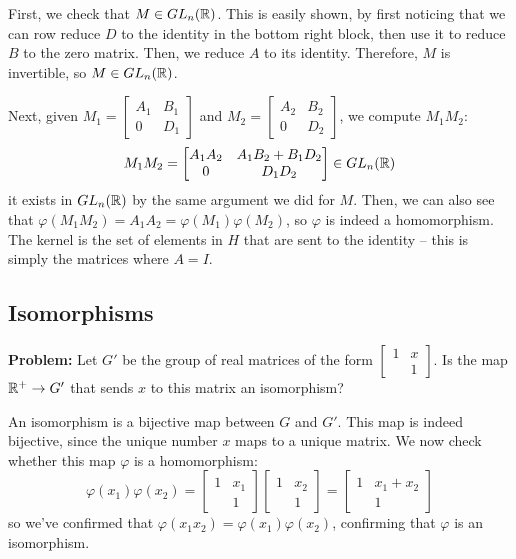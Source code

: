 \documentclass[10pt]{article}
\newenvironment{problem}{\textbf{Problem:}}{}
\begin{document}
\begin{solution}
	First, we check that \( M \in GL_n(\mathbb R) \). This is easily shown, by first 
	noticing that we can row reduce \( D \) to the identity in the bottom right block, 
	then use it to reduce \( B \) to the zero matrix. Then, we reduce \( A \) to its 
	identity. Therefore, \( M \) is invertible, so \( M \in GL_n(\mathbb R) \). 

	Next, given \( M_1 = \begin{bmatrix} A_1 & B_1 \\ 0 & D_1 \end{bmatrix}  \) 
	and \( M_2 = \begin{bmatrix} A_2 & B_2\\ 0 & D_2\end{bmatrix}  \), 
	we compute \( M_1M_2 \):
	\[
		M_1M_2 = \begin{bmatrix} A_1A_2 & A_1 B_2 + B_1D_2\\0 & D_1D_2 \end{bmatrix}
		\in GL_n(\mathbb R)
	\] 
	it exists in \( GL_n(\mathbb R) \) by the same argument we did for \( M \). 
	Then, we can also see that \( \varphi(M_1M_2) = A_1A_2 = 
	\varphi(M_1) \varphi(M_2) \), so \( \varphi \) is indeed a homomorphism. The 
	kernel is the set of elements in \( H \) that are sent to the 
	identity -- this is simply the matrices where \( A = I \).   
\end{solution}

\subsection{Isomorphisms}
\begin{problem}
	Let \( G' \) be the group of real matrices of the form 
	\( \begin{bmatrix} 1 & x \\  & 1 \end{bmatrix}  \). Is the map 
	\( \mathbb R^{+} \to G' \) that sends \( x \) to this matrix an isomorphism?
\end{problem}

\begin{solution}
	An isomorphism is a bijective map between \( G \) and \( G' \). This map 
	is indeed bijective, since the unique number \( x \) maps to a unique matrix. We 
	now check whether this map \( \varphi \) is a homomorphism:
	\[
		\varphi(x_1) \varphi(x_2) = \begin{bmatrix} 1 & x_1 \\ & 1 \end{bmatrix} 
		\begin{bmatrix} 1 & x_2 \\ & 1 \end{bmatrix}  = 
		\begin{bmatrix} 1 & x_1 + x_2\\ & 1 \end{bmatrix} 
	\] 
	so we've confirmed that \( \varphi(x_1x_2) = \varphi(x_1) \varphi(x_2) \), 
	confirming that \( \varphi \) is an isomorphism. 
\end{solution}
\end{document}
